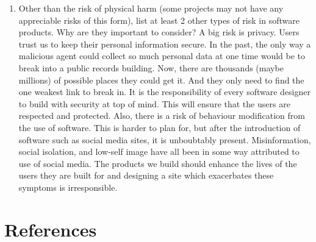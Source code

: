 \documentclass{article}
\begin{document}
\begin{enumerate}
    \item Other than the risk of physical harm (some projects may not have any
    appreciable risks of this form), list at least 2 other types of risk in
    software products. Why are they important to consider?
    A big risk is privacy. Users trust us to keep their personal information secure. In the past, the only way a malicious agent could collect so much personal data at one time 
    would be to break into a public records building. Now, there are thousands (maybe millions) of possible places they could get it. And they only need to find the one weakest link to break in. 
    It is the responsibility of every software designer to build with security at top of mind. This will ensure that the users are respected and protected.
    Also, there is a risk of behaviour modification from the use of software. This is harder to plan for, but after the introduction of software such as social media sites, it is unboubtably present.
    Misinformation, social isolation, and low-self image have all been in some way attributed to use of social media. The products we build should enhance the lives of the users they are built for
    and designing a site which exacerbates these symptoms is irresponsible.

\end{enumerate}
\newpage
\section{References}
\sloppy
\end{document}

